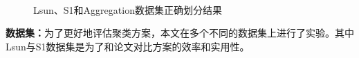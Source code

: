 \begin{figure}[htbp]
	\centering
	\\
	\caption{Lsun、S1和Aggregation数据集正确划分结果}
\end{figure}

\textbf{数据集：}为了更好地评估聚类方案，本文在多个不同的数据集上进行了实验。其中Lsun与S1数据集是为了和论文\cite{bozdemir2021privacy}对比方案的效率和实用性。

